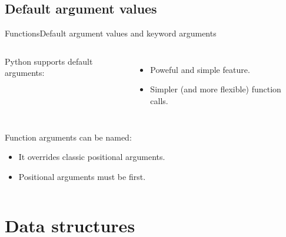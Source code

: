 \documentclass[10pt,compress]{beamer} %
\begin{document}
\subsection{Default argument values}
\begin{frame}{Functions}{Default argument values and keyword arguments}
    \begin{columns}
	Python supports default arguments:
		\begin{itemize}
		\item Poweful and simple feature.
		\item Simpler (and more flexible) function calls.
		\end{itemize}
		\vspace{-0.2cm}
		\begin{exampleblock}{}
		\vspace{-0.2cm}
		
		\vspace{-0.2cm}
		\end{exampleblock}
	\end{columns}
	Function arguments can be named:
		\begin{itemize}
		\item It overrides classic positional arguments.
		\item Positional arguments must be first.
		\end{itemize}
		\vspace{-0.2cm}
    \begin{columns}
		\begin{exampleblock}{}
		\vspace{-0.2cm}
		
		\vspace{-0.2cm}
		\end{exampleblock}

	\column{0.6\textwidth}
		\begin{exampleblock}{}
		\vspace{-0.2cm}
		
		\vspace{-0.2cm}
		\end{exampleblock}
	\end{columns}
\end{frame}

\section{Data structures}
\end{document}
